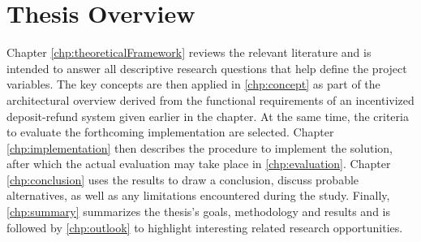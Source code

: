 
\section{Thesis Overview}
Chapter \ref{chp:theoreticalFramework} reviews the relevant literature and is intended to answer all descriptive research questions that help define the project variables. The key concepts are then applied in \autoref{chp:concept} as part of the architectural overview derived from the functional requirements of an incentivized deposit-refund system given earlier in the chapter. At the same time, the criteria to evaluate the forthcoming implementation are selected. Chapter \ref{chp:implementation} then describes the procedure to implement the solution, after which the actual evaluation may take place in \autoref{chp:evaluation}. Chapter \ref{chp:conclusion} uses the results to draw a conclusion, discuss probable alternatives, as well as any limitations encountered during the study. Finally, \autoref{chp:summary} summarizes the thesis's goals, methodology and results and is followed by \autoref{chp:outlook} to highlight interesting related research opportunities.






